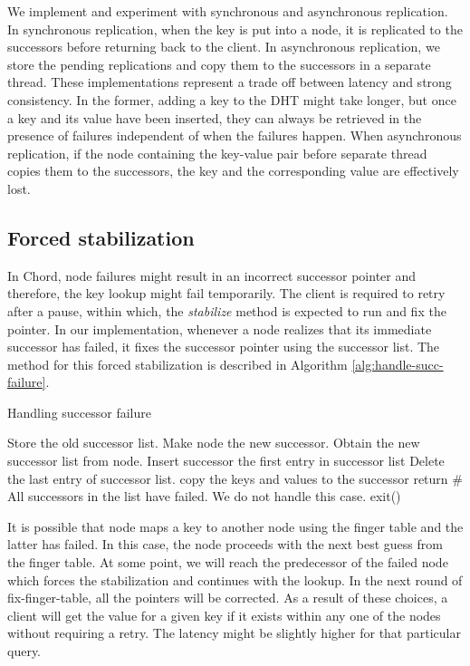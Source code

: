 \documentclass{sig-alternate-10pt}
\begin{document}
We implement and experiment with synchronous and asynchronous replication. In synchronous replication, when the key is put into a node, it is replicated to the successors before returning back to the client. In asynchronous replication, we store the pending replications and copy them to the successors in a separate thread. These implementations represent a trade off between latency and strong consistency. In the former, adding a key to the DHT might take longer, but once a key and its value have been inserted, they can always be retrieved in the presence of failures independent of when the failures happen. When asynchronous replication, if the node containing the key-value pair before separate thread copies them to the successors, the key and the corresponding value are effectively lost.

\subsection{Forced stabilization}
In Chord, node failures might result in an incorrect successor pointer and therefore, the key lookup might fail temporarily. The client is required to retry after a pause, within which, the \textit{stabilize} method is expected to run and fix the pointer. In our implementation, whenever a node realizes that its immediate successor has failed, it fixes the successor pointer using the successor list. The method for this forced stabilization is described in Algorithm \ref{alg:handle-succ-failure}.
\begin{algorithm}[t]
\caption{Handling successor failure} \label{alg:handle-succ-failure}
\begin{algorithmic}
            \State Store the old successor list.
            \State Make node the new successor.
            \State Obtain the new successor list from node.
            \State Insert successor the first entry in successor list
            \State Delete the last entry of successor list.
                \State copy the keys and values to the successor
            \EndFor
            \State return
        \EndIf
    \EndFor
    \# All successors in the list have failed. We do not handle this case.
    \State exit()
\end{algorithmic}
\end{algorithm}

It is possible that node maps a key to another node using the finger table and the latter has failed. In this case, the node proceeds with the next best guess from the finger table. At some point, we will reach the predecessor of the failed node which forces the stabilization and continues with the lookup. In the next round of fix-finger-table, all the pointers will be corrected. As a result of these choices, a client will get the value for a given key if it exists within any one of the nodes without requiring a retry. The latency might be slightly higher for that particular query.
\end{document}
